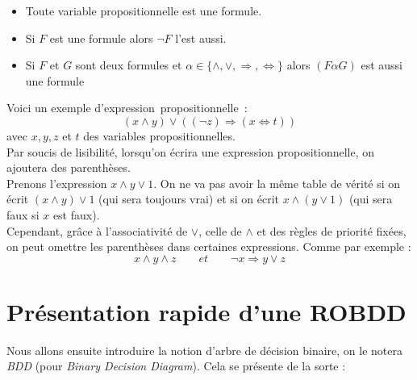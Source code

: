 \documentclass[a4paper, oneside]{report}
\newcommand{\expp}{expression~propositionnelle~}
\begin{document}
\begin{itemize}
\item Toute variable propositionnelle est une formule.
\item Si $F$ est une formule alors $\neg F$ l'est aussi.
\item Si $F$ et $G$ sont deux formules et $\alpha \in \{\wedge, \vee, \Rightarrow, \Leftrightarrow\}$ alors $(F \alpha G)$ est aussi une formule
\end{itemize}
Voici un exemple d'\expp :
$$(x \wedge y) \vee ((\neg z) \Rightarrow (x \Leftrightarrow t))$$
avec $x,y,z$ et $t$ des variables propositionnelles.\\

\noindent Par soucis de lisibilité, lorsqu'on écrira une expression propositionnelle, on ajoutera des parenthèses.\\
Prenons l'expression $x\wedge y\vee 1$. On ne va pas avoir la même table de vérité si on écrit $(x\wedge y)\vee 1$ (qui sera toujours vrai) et si on écrit $x \wedge (y \vee 1)$ (qui sera faux si $x$ est faux).\\
Cependant, grâce à l'associativité de $\vee$, celle de $\wedge$ et des règles de priorité fixées, on peut omettre les parenthèses dans certaines expressions. Comme par exemple :
$$x \wedge y \wedge z \hspace{2em} et \hspace{2em} \neg x \Rightarrow y \vee z$$

\section*{Présentation rapide d'une ROBDD}

\noindent Nous allons ensuite introduire la notion d'arbre de décision binaire, on le notera \textit{BDD} (pour \textit{Binary Decision Diagram}). Cela se présente de la sorte :
\end{document}
